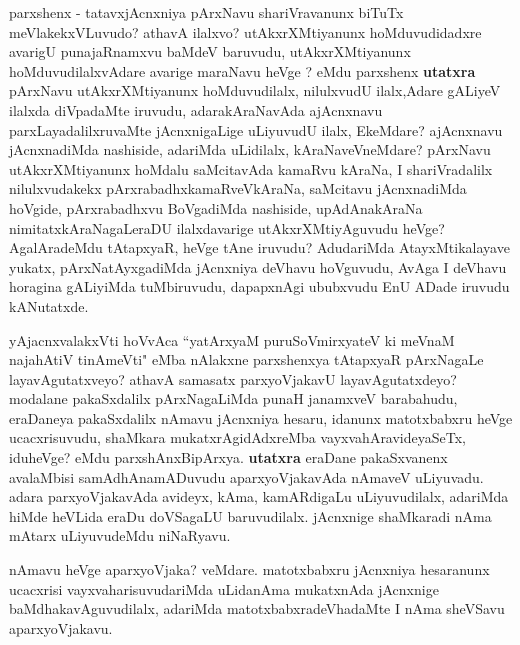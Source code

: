 \centerline{}

\begin{artha}
parxshenx - tatavxjAcnxniya pArxNavu shariVravanunx biTuTx meVlakekxVLuvudo? athavA ilalxvo? utAkxrXMtiyanunx hoMduvudidadxre avarigU punajaRnamxvu baMdeV baruvudu, utAkxrXMtiyanunx hoMduvudilalxvAdare avarige maraNavu heVge	? eMdu parxshenx \ndash 
\textbf{utatxra \ndash } pArxNavu utAkxrXMtiyanunx hoMduvudilalx, nilulxvudU ilalx,Adare gALiyeV ilalxda diVpadaMte iruvudu, adarakAraNavAda ajAcnxnavu parxLayadalilxruvaMte jAcnxnigaLige uLiyuvudU ilalx, EkeMdare? ajAcnxnavu jAcnxnadiMda nashiside, adariMda uLidilalx, kAraNaveVneMdare? pArxNavu utAkxrXMtiyanunx hoMdalu saMcitavAda kamaRvu kAraNa, I shariVradalilx nilulxvudakekx pArxrabadhxkamaRveVkAraNa, saMcitavu jAcnxnadiMda hoVgide, pArxrabadhxvu BoVgadiMda nashiside, upAdAnakAraNa nimitatxkAraNagaLeraDU ilalxdavarige utAkxrXMtiyAguvudu heVge? AgalAradeMdu tAtapxyaR, heVge tAne iruvudu? AdudariMda AtayxMtikalayave yukatx, pArxNatAyxgadiMda jAcnxniya deVhavu hoVguvudu, AvAga I deVhavu horagina gALiyiMda tuMbiruvudu, dapapxnAgi ububxvudu EnU ADade iruvudu kANutatxde.
\end{artha}

\begin{artha}
yAjacnxvalakxVti hoVvAca ``yatArxyaM puruSoVmirxyateV ki meVnaM  naja{\null}hAtiV tinAmeVti" eMba nAlakxne parxshenxya tAtapxyaR pArxNagaLe layavAgutatxveyo? athavA samasatx parxyoVjakavU layavAgutatxdeyo? modalane pakaSxdalilx pArxNagaLiMda punaH janamxveV barabahudu, eraDaneya pakaSxdalilx nAmavu jAcnxniya hesaru, idanunx matotxbabxru heVge ucacxrisuvudu, shaMkara mukatxrAgidAdxreMba vayxvahAravideyaSeTx, iduheVge? eMdu parxshAnxBipArxya. \textbf{utatxra} \ndash  eraDane pakaSxvanenx avalaMbisi samAdhAnamADuvudu aparxyoVjakavAda nAmaveV uLiyuvadu. adara parxyoVjakavAda avideyx, kAma, kamARdigaLu uLiyuvudilalx, adariMda hiMde heVLida eraDu doVSagaLU baruvudilalx. jAcnxnige shaMkaradi nAma mAtarx  uLiyuvudeMdu niNaRyavu.

nAmavu heVge aparxyoVjaka? veMdare. matotxbabxru jAcnxniya hesaranunx ucacxrisi vayxvaharisuvudariMda uLidanAma mukatxnAda jAcnxnige baMdhakavAguvudilalx, adariMda matotxbabxradeVhadaMte I nAma sheVSavu aparxyoVjakavu.
\end{artha}

\centerline{}

